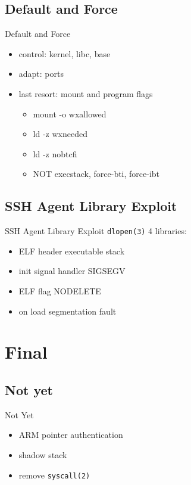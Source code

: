 \documentclass[14pt,aspectratio=169]{beamer}
\begin{document}
\subsection{Default and Force}
\begin{frame}{Default and Force}
\begin{itemize}
  \item control: kernel, libc, base
  \item adapt: ports
  \item last resort: mount and program flags
  \begin{itemize}
    \item mount -o wxallowed
    \item ld -z wxneeded
    \item ld -z nobtcfi
    \item NOT execstack, force-bti, force-ibt
  \end{itemize}
\end{itemize}
\end{frame}

\subsection{SSH Agent Library Exploit}
\begin{frame}{SSH Agent Library Exploit}
\texttt{dlopen(3)} 4 libraries:
\begin{itemize}
  \item ELF header executable stack
  \item init signal handler SIGSEGV
  \item ELF flag NODELETE
  \item on load segmentation fault
\end{itemize}
\end{frame}

\section{Final}

\subsection{Not yet}
\begin{frame}{Not Yet}
\begin{itemize}
  \item ARM pointer authentication
  \item shadow stack
  \item remove \texttt{syscall(2)}
\end{itemize}
\end{frame}
\end{document}
